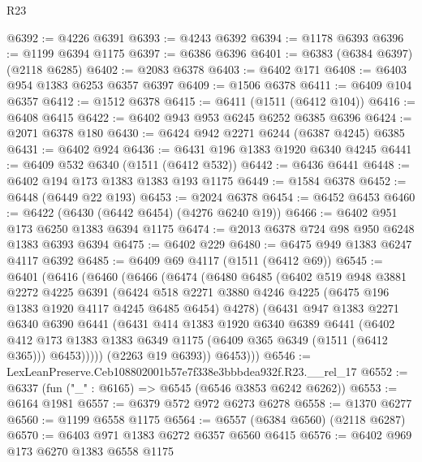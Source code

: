 \begin{lexlean}{R23}
\begin{coremodule}
@6392 := @4226 @6391
@6393 := @4243 @6392
@6394 := @1178 @6393
@6396 := @1199 @6394 @1175
@6397 := @6386 @6396
@6401 := @6383 (@6384 @6397) (@2118 @6285)
@6402 := @2083 @6378
@6403 := @6402 @171
@6408 := @6403 @954 @1383 @6253 @6357 @6397
@6409 := @1506 @6378
@6411 := @6409 @104 @6357
@6412 := @1512 @6378
@6415 := @6411 (@1511 (@6412 @104))
@6416 := @6408 @6415
@6422 := @6402 @943 @953 @6245 @6252 @6385 @6396
@6424 := @2071 @6378 @180
@6430 := @6424 @942 @2271 @6244 (@6387 @4245) @6385
@6431 := @6402 @924
@6436 := @6431 @196 @1383 @1920 @6340 @4245
@6441 := @6409 @532 @6340 (@1511 (@6412 @532))
@6442 := @6436 @6441
@6448 := @6402 @194 @173 @1383 @1383 @193 @1175
@6449 := @1584 @6378
@6452 := @6448 (@6449 @22 @193)
@6453 := @2024 @6378
@6454 := @6452 @6453
@6460 := @6422 (@6430 (@6442 @6454) (@4276 @6240 @19))
@6466 := @6402 @951 @173 @6250 @1383 @6394 @1175
@6474 := @2013 @6378 @724 @98 @950 @6248 @1383 @6393 @6394
@6475 := @6402 @229
@6480 := @6475 @949 @1383 @6247 @4117 @6392
@6485 := @6409 @69 @4117 (@1511 (@6412 @69))
@6545 := @6401
    (@6416
      (@6460
        (@6466
          (@6474
            (@6480
              @6485
              (@6402
                @519
                @948
                @3881
                @2272
                @4225
                @6391
                (@6424
                  @518
                  @2271
                  @3880
                  @4246
                  @4225
                  (@6475 @196 @1383 @1920 @4117 @4245 @6485 @6454)
                  @4278)
                (@6431
                  @947
                  @1383
                  @2271
                  @6340
                  @6390
                  @6441
                  (@6431
                    @414
                    @1383
                    @1920
                    @6340
                    @6389
                    @6441
                    (@6402
                      @412
                      @173
                      @1383
                      @1383
                      @6349
                      @1175
                      (@6409 @365 @6349 (@1511 (@6412 @365)))
                      @6453)))))
            (@2263 @19 @6393))
          @6453)))
@6546 := LexLeanPreserve.Ceb108802001b57e7f338e3bbbdea932f.R23.__rel_17
@6552 := @6337 (fun ("_" : @6165) => @6545 (@6546 @3853 @6242 @6262))
@6553 := @6164 @1981
@6557 := @6379 @572 @972 @6273 @6278
@6558 := @1370 @6277
@6560 := @1199 @6558 @1175
@6564 := @6557 (@6384 @6560) (@2118 @6287)
@6570 := @6403 @971 @1383 @6272 @6357 @6560 @6415
@6576 := @6402 @969 @173 @6270 @1383 @6558 @1175

\end{coremodule}
\end{lexlean}
